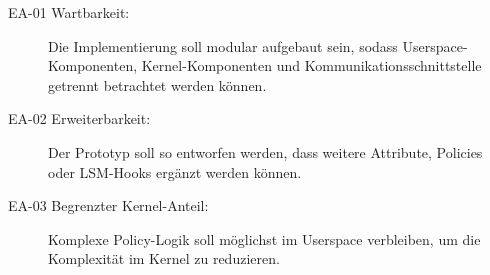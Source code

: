\begin{description}
    \item[EA-01 Wartbarkeit:]
    Die Implementierung soll modular aufgebaut sein, sodass Userspace-Komponenten, Kernel-Komponenten und Kommunikationsschnittstelle getrennt betrachtet werden können.

    \item[EA-02 Erweiterbarkeit:]
    Der Prototyp soll so entworfen werden, dass weitere Attribute, Policies oder LSM-Hooks ergänzt werden können.

    \item[EA-03 Begrenzter Kernel-Anteil:]
    Komplexe Policy-Logik soll möglichst im Userspace verbleiben, um die Komplexität im Kernel zu reduzieren.
\end{description}




\newpage

